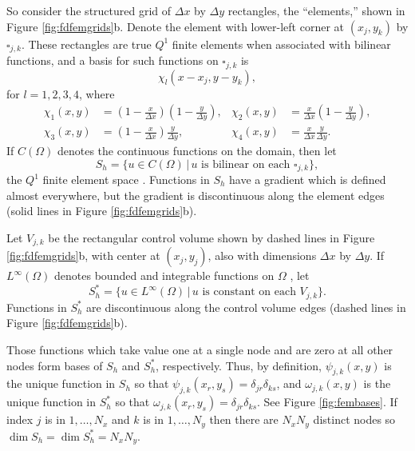 \documentclass[11pt]{amsart}
\begin{document}
So consider the structured grid of $\Delta x$ by $\Delta y$ rectangles, the ``elements,'' shown in Figure \ref{fig:fdfemgrids}b.  Denote the element with lower-left corner at $(x_j,y_k)$ by $\square_{j,k}$.  These rectangles are true $Q^1$ finite elements when associated with bilinear functions, and a basis for such functions on $\square_{j,k}$ is
\begin{equation}
\chi_l(x-x_j,y-y_k), \label{eq:elementbasis}
\end{equation}
for $l=1,2,3,4$, where
\begin{align*}
\chi_1(x,y) &= \left(1-\frac{x}{\Delta x}\right) \left(1-\frac{y}{\Delta y}\right), & \chi_2(x,y) &= \frac{x}{\Delta x} \left(1-\frac{y}{\Delta y}\right), \\
\chi_3(x,y) &= \left(1-\frac{x}{\Delta x}\right) \frac{y}{\Delta y}, & \chi_4(x,y) &= \frac{x}{\Delta x} \frac{y}{\Delta y}. 
\end{align*}
If $C(\Omega)$ denotes the continuous functions on the domain, then let
\begin{equation}
S_h = \{u \in C(\Omega) \,\big|\, u \text{ is bilinear on each $\square_{j,k}$}\},
\end{equation}
the $Q^1$ finite element space \cite{Elmanetal2005}.  Functions in $S_h$ have a gradient which is defined almost everywhere, but the gradient is discontinuous along the element edges (solid lines in Figure \ref{fig:fdfemgrids}b).

Let $V_{j,k}$ be the rectangular control volume shown by dashed lines in Figure \ref{fig:fdfemgrids}b, with center at $(x_j,y_j)$, also with dimensions $\Delta x$ by $\Delta y$.  If $L^\infty(\Omega)$ denotes bounded and integrable functions on $\Omega$ \cite{Evans}, let
\begin{equation}
S_h^* = \{u \in L^\infty(\Omega) \,\big|\, u \text{ is constant on each $V_{j,k}$}\}.
\end{equation}
Functions in $S_h^*$ are discontinuous along the control volume edges (dashed lines in Figure \ref{fig:fdfemgrids}b).

Those functions which take value one at a single node and are zero at all other nodes form bases of $S_h$ and $S_h^*$, respectively.  Thus, by definition, $\psi_{j,k}(x,y)$ is the unique function in $S_h$ so that $\psi_{j,k}(x_r,y_s) = \delta_{jr} \delta_{ks}$, and $\omega_{j,k}(x,y)$ is the unique function in $S_h^*$  so that $\omega_{j,k}(x_r,y_s) = \delta_{jr} \delta_{ks}$.  See Figure \ref{fig:fembases}.  If index $j$ is in $1,\dots,N_x$ and $k$ is in $1,\dots,N_y$ then there are $N_xN_y$ distinct nodes so $\dim S_h = \dim S_h^* = N_x N_y$.  
\end{document}

